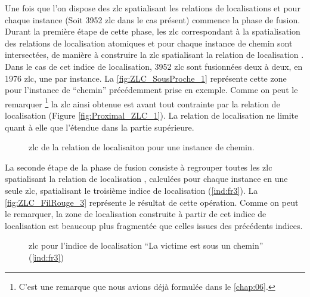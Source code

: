 Une fois que l'on dispose des \ac{zlc} spatialisant les relations de
localisations  et
 pour chaque instance (Soit
\num{3952} \ac{zlc} dans le cas présent) commence la phase de
fusion. Durant la première étape de cette phase, les \ac{zlc}
correspondant à la spatialisation des relations de localisation
atomiques  et
 pour chaque instance de chemin sont
intersectées, de manière à construire la \ac{zlc} spatialisant la
relation de localisation . Dans le cas de
cet indice de localisation, \num{3952} \ac{zlc} sont fusionnées deux à
deux, en \num{1976} \ac{zlc}, une par instance. La
\autoref{fig:ZLC_SousProche_1} représente cette zone pour l'instance
de \enquote{chemin} précédemment prise en exemple. Comme on peut le
remarquer \footnote{C'est une remarque que nous avions déjà formulée
  dans le \autoref{chap:06}.} la \ac{zlc} ainsi obtenue est avant tout
contrainte par la relation de localisation 
(Figure \ref{fig:Proximal_ZLC_1}). La relation de localisation
 ne limite quant à elle que l'étendue dans
la partie supérieure.

\begin{figure}
  \centering
  
  \caption{\ac{zlc} de la relation de localisaiton
    \protect{} pour une instance de chemin.}
    \label{fig:ZLC_SousProche_1}
\end{figure}

La seconde étape de la phase de fusion consiste à regrouper toutes les
\ac{zlc} spatialisant la relation de localisation
, calculées pour chaque instance en une
seule \ac{zlc}, spatialisant le troisième indice de localisation
(\ref{ind:fr3}). La \autoref{fig:ZLC_FilRouge_3} représente le
résultat de cette opération. Comme on peut le remarquer, la zone de
localisation construite à partir de cet indice de localisation est
beaucoup plus fragmentée que celles issues des précédents
indices. 
 
\begin{figure}
  \centering
  
  \caption{\ac{zlc} pour l'indice de localisation \enquote{La victime
      est sous un chemin} (\ref{ind:fr3})}
    \label{fig:ZLC_FilRouge_3}
\end{figure}

